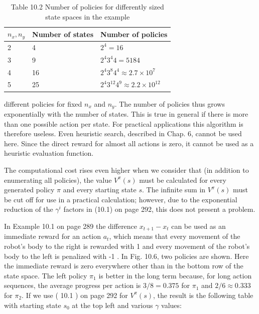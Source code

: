\documentclass[10pt]{book}
\begin{document}
\begin{table}[htbp]
\begin{center}
\captionsetup{labelformat=empty}
\caption{Table 10.2 Number of policies for differently sized state spaces in the example}
\begin{tabular}{lll}
\hline
$n_{x}, n_{y}$ & Number of states & Number of policies \\

\hline
2 & 4 & $2^{4}=16$ \\
3 & 9 & $2^{4} 3^{4} 4=5184$ \\
\hline
4 & 16 & $2^{4} 3^{8} 4^{4} \approx 2.7 \times 10^{7}$ \\
\hline
5 & 25 & $2^{4} 3^{12} 4^{9} \approx 2.2 \times 10^{12}$ \\
\hline
\end{tabular}
\end{center}
\end{table}

different policies for fixed $n_{x}$ and $n_{y}$. The number of policies thus grows exponentially with the number of states. This is true in general if there is more than one possible action per state. For practical applications this algorithm is therefore useless. Even heuristic search, described in Chap. 6, cannot be used here. Since the direct reward for almost all actions is zero, it cannot be used as a heuristic evaluation function.

The computational cost rises even higher when we consider that (in addition to enumerating all policies), the value $V^{\pi}(s)$ must be calculated for every generated policy $\pi$ and every starting state $s$. The infinite sum in $V^{\pi}(s)$ must be cut off for use in a practical calculation; however, due to the exponential reduction of the $\gamma^{i}$ factors in (10.1) on page 292, this does not present a problem.

In Example 10.1 on page 289 the difference $x_{t+1}-x_{t}$ can be used as an immediate reward for an action $a_{t}$, which means that every movement of the robot's body to the right is rewarded with 1 and every movement of the robot's body to the left is penalized with -1 . In Fig. 10.6, two policies are shown. Here the immediate reward is zero everywhere other than in the bottom row of the state space. The left policy $\pi_{1}$ is better in the long term because, for long action sequences, the average progress per action is $3 / 8=0.375$ for $\pi_{1}$ and $2 / 6 \approx 0.333$ for $\pi_{2}$. If we use ( 10.1 ) on page 292 for $V^{\pi}(s)$, the result is the following table with starting state $s_{0}$ at the top left and various $\gamma$ values:
\end{document}
